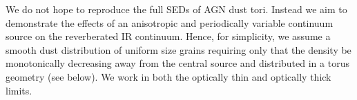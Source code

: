 


We do not hope to reproduce the full SEDs of AGN dust tori. Instead we aim to
demonstrate the effects of an anisotropic and periodically variable continuum
source on the reverberated IR continuum. Hence, for simplicity, we assume a
smooth dust distribution of uniform size grains requiring only that the
density be monotonically decreasing away from the central source and
distributed in a torus geometry (see below). We work in both the optically
thin and optically thick limits.












